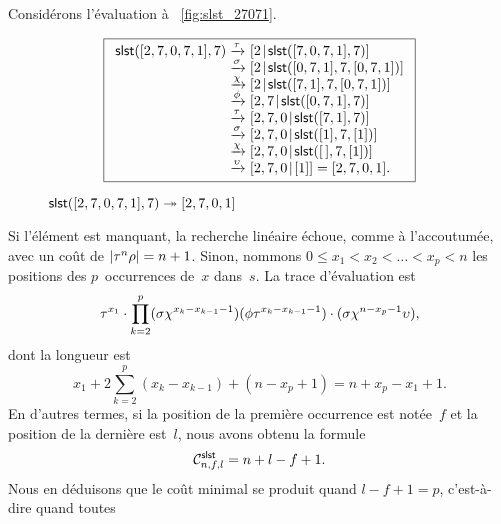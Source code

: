 Considérons l'évaluation à \fig~\vref{fig:slst_27071}.
\begin{figure}
\begin{equation*}
\boxed{%
\begin{array}{r@{\;}l@{\;}l}
\fun{slst}([2,7,0,7,1],7)
& \xrightarrow{\smash{\tau}}
& \cons{2}{\fun{slst}([7,0,7,1],7)}\\
& \xrightarrow{\smash{\sigma}}
& \cons{2}{\fun{slst}([0,7,1],7,[0,7,1])}\\
& \xrightarrow{\smash{\chi}}
& \cons{2}{\fun{slst}([7,1],7,[0,7,1])}\\
& \xrightarrow{\smash{\phi}}
& \cons{2,7}{\fun{slst}([0,7,1],7)}\\
& \xrightarrow{\smash{\tau}}
& \cons{2,7,0}{\fun{slst}([7,1],7)}\\
& \xrightarrow{\smash{\sigma}}
& \cons{2,7,0}{\fun{slst}([1],7,[1])}\\
& \xrightarrow{\smash{\chi}}
& \cons{2,7,0}{\fun{slst}(\el,7,[1])}\\
& \xrightarrow{\smash{\upsilon}}
& \cons{2,7,0}{[1]} = [2,7,0,1].
\end{array}}
\end{equation*}
\caption{\(\fun{slst}([2,7,0,7,1],7) \twoheadrightarrow [2,7,0,1]\)}
\label{fig:slst_27071}
\end{figure}
Si l'élément est manquant, la recherche linéaire échoue, comme à
l'accoutumée, avec un coût de \(\len{\tau^n\rho} = n + 1\). Sinon,
nommons \( 0 \leqslant x_1 < x_2 < \dots < x_p < n\) les positions des
\(p\)~occurrences de~\(x\) dans~\(s\). La trace
d'évaluation est
\begin{equation*}
\abovedisplayskip=0pt
\belowdisplayskip=0pt
\tau^{x_1}
\cdot
\prod_{k=2}^{p}(\sigma\chi^{x_k-x_{k-1}-1})(\phi\tau^{x_k-x_{k-1}-1})
\cdot
(\sigma\chi^{n-x_p-1}\upsilon),
\end{equation*}
dont la longueur est
\begin{equation*}
  x_1 + 2\sum_{k=2}^{p}(x_k-x_{k-1}) + (n - x_p + 1) = n + x_p - x_1 + 1.
\end{equation*}
En d'autres termes, si la position de la
première occurrence est notée~\(f\) et la position de la dernière
est~\(l\), nous avons obtenu la formule
\begin{equation*}
\C{\fun{slst}}{n,f,l} = n + l - f + 1.
\end{equation*}
Nous en déduisons que le coût minimal se produit quand \(l-f+1 = p\), c'est-à-dire quand toutes
